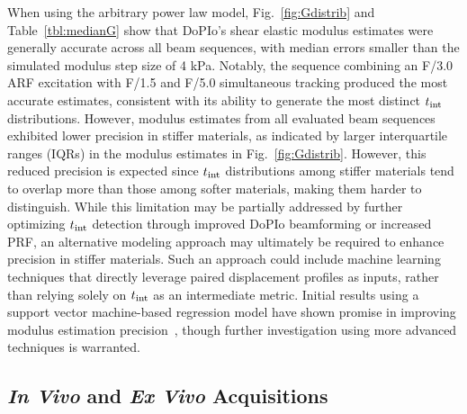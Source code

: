When using the arbitrary power law model, Fig.~\ref{fig:Gdistrib} and Table~\ref{tbl:medianG} show that DoPIo's shear elastic modulus estimates were generally accurate across all beam sequences, with median errors smaller than the simulated modulus step size of 4 kPa. Notably, the sequence combining an F/3.0 ARF excitation with F/1.5 and F/5.0 simultaneous tracking produced the most accurate estimates, consistent with its ability to generate the most distinct $t_{\textnormal{int}}$ distributions. However, modulus estimates from all evaluated beam sequences exhibited lower precision in stiffer materials, as indicated by larger interquartile ranges (IQRs) in the modulus estimates in Fig.~\ref{fig:Gdistrib}. However, this reduced precision is expected since $t_{\textnormal{int}}$ distributions among stiffer materials tend to overlap more than those among softer materials, making them harder to distinguish. While this limitation may be partially addressed by further optimizing $t_{\textnormal{int}}$ detection through improved DoPIo beamforming or increased PRF, an alternative modeling approach may ultimately be required to enhance precision in stiffer materials. Such an approach could include machine learning techniques that directly leverage paired displacement profiles as inputs, rather than relying solely on $t_{\textnormal{int}}$ as an intermediate metric. Initial results using a support vector machine-based regression model have shown promise in improving modulus estimation precision~\cite{rahmouni_Machine_2020}, though further investigation using more advanced techniques is warranted.

\subsection{\emph{In Vivo} and \emph{Ex Vivo} Acquisitions}

